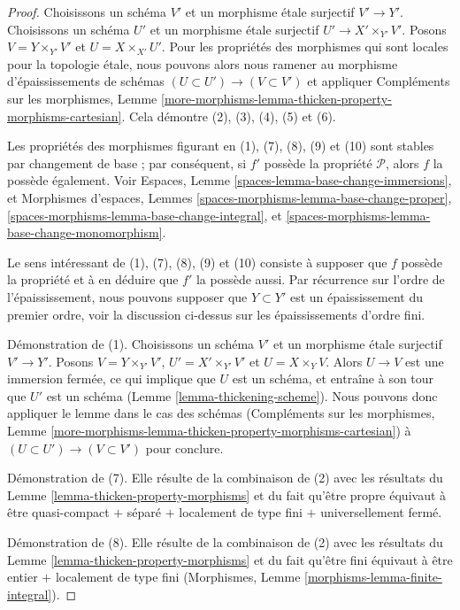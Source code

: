 \begin{proof}
Choisissons un schéma $V'$ et un morphisme étale surjectif $V' \to Y'$.
Choisissons un schéma $U'$ et un morphisme étale surjectif
$U' \to X' \times_{Y'} V'$. Posons $V = Y \times_{Y'} V'$ et
$U = X \times_{X'} U'$. Pour les propriétés des morphismes qui sont locales
pour la topologie étale, nous pouvons alors nous ramener au morphisme d'épaississements de schémas
$(U \subset U') \to (V \subset V')$ et appliquer Compléments sur les morphismes, Lemme
\ref{more-morphisms-lemma-thicken-property-morphisms-cartesian}.
Cela démontre (2), (3), (4), (5) et (6).

\medskip\noindent
Les propriétés des morphismes figurant en (1), (7), (8), (9) et (10) sont stables
par changement de base ; par conséquent, si $f'$ possède la propriété $\mathcal{P}$, alors
$f$ la possède également. Voir
Espaces, Lemme \ref{spaces-lemma-base-change-immersions},
et
Morphismes d'espaces, Lemmes
\ref{spaces-morphisms-lemma-base-change-proper},
\ref{spaces-morphisms-lemma-base-change-integral}, et
\ref{spaces-morphisms-lemma-base-change-monomorphism}.

\medskip\noindent
Le sens intéressant de (1), (7), (8), (9) et (10) consiste à supposer
que $f$ possède la propriété et à en déduire que $f'$ la possède aussi.
Par récurrence sur l'ordre de l'épaississement, nous pouvons
supposer que $Y \subset Y'$ est un épaississement du premier ordre, voir la
discussion ci-dessus sur les épaississements d'ordre fini.

\medskip\noindent
Démonstration de (1). Choisissons un schéma $V'$ et un morphisme étale surjectif
$V' \to Y'$. Posons $V = Y \times_{Y'} V'$, $U' = X' \times_{Y'} V'$ et
$U = X \times_Y V$. Alors $U \to V$ est une immersion fermée, ce qui
implique que $U$ est un schéma, et entraîne à son tour que $U'$ est
un schéma (Lemme \ref{lemma-thickening-scheme}). Nous pouvons donc appliquer
le lemme dans le cas des schémas
(Compléments sur les morphismes, Lemme
\ref{more-morphisms-lemma-thicken-property-morphisms-cartesian})
à $(U \subset U') \to (V \subset V')$ pour conclure.

\medskip\noindent
Démonstration de (7). Elle résulte de la combinaison de (2) avec les
résultats du Lemme \ref{lemma-thicken-property-morphisms}
et du fait qu'être propre équivaut à être quasi-compact $+$
séparé $+$ localement de type fini $+$ universellement fermé.

\medskip\noindent
Démonstration de (8). Elle résulte de la combinaison de (2) avec les
résultats du Lemme \ref{lemma-thicken-property-morphisms}
et du fait qu'être fini équivaut à être entier $+$ localement
de type fini (Morphismes, Lemme \ref{morphisms-lemma-finite-integral}).


\end{proof}
